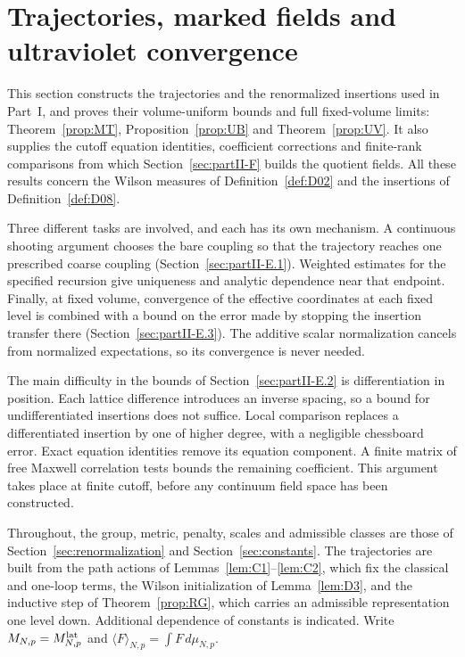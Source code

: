 \section{Trajectories, marked fields and ultraviolet convergence}\label{sec:partII-E}

This section constructs the trajectories and the renormalized insertions used in Part~I, and proves their volume-uniform bounds and full fixed-volume limits: Theorem~\ref{prop:MT}, Proposition~\ref{prop:UB} and Theorem~\ref{prop:UV}. It also supplies the cutoff equation identities, coefficient corrections and finite-rank comparisons from which Section~\ref{sec:partII-F} builds the quotient fields. All these results concern the Wilson measures of Definition~\ref{def:D02} and the insertions of Definition~\ref{def:D08}.

Three different tasks are involved, and each has its own mechanism. A continuous shooting argument chooses the bare coupling so that the trajectory reaches one prescribed coarse coupling (Section~\ref{sec:partII-E.1}). Weighted estimates for the specified recursion give uniqueness and analytic dependence near that endpoint. Finally, at fixed volume, convergence of the effective coordinates at each fixed level is combined with a bound on the error made by stopping the insertion transfer there (Section~\ref{sec:partII-E.3}). The additive scalar normalization cancels from normalized expectations, so its convergence is never needed.

The main difficulty in the bounds of Section~\ref{sec:partII-E.2} is differentiation in position. Each lattice difference introduces an inverse spacing, so a bound for undifferentiated insertions does not suffice. Local comparison replaces a differentiated insertion by one of higher degree, with a negligible chessboard error. Exact equation identities remove its equation component. A finite matrix of free Maxwell correlation tests bounds the remaining coefficient. This argument takes place at finite cutoff, before any continuum field space has been constructed.

Throughout, the group, metric, penalty, scales and admissible classes are those of Section~\ref{sec:renormalization} and Section~\ref{sec:constants}. The trajectories are built from the path actions of Lemmas~\ref{lem:C1}--\ref{lem:C2}, which fix the classical and one-loop terms, the Wilson initialization of Lemma~\ref{lem:D3}, and the inductive step of Theorem~\ref{prop:RG}, which carries an admissible representation one level down. Additional dependence of constants is indicated. Write $M_{N,p}=M^{\mathrm{lat}}_{N,p}$ and $\langle F\rangle_{N,p}=\int F\,d\mu_{N,p}$.

